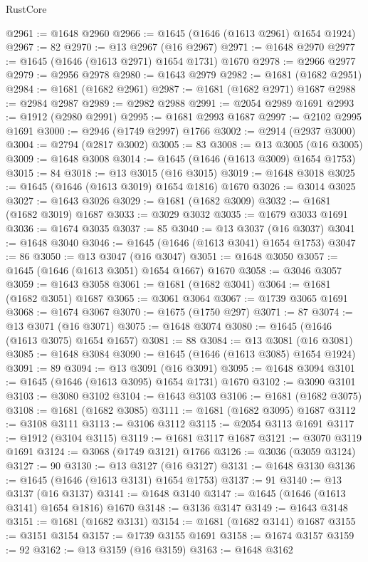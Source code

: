 \begin{lexlean}{RustCore}
\begin{coremodule}
@2961 := @1648 @2960
@2966 := @1645 (@1646 (@1613 @2961) @1654 @1924)
@2967 := 82
@2970 := @13 @2967 (@16 @2967)
@2971 := @1648 @2970
@2977 := @1645 (@1646 (@1613 @2971) @1654 @1731) @1670
@2978 := @2966 @2977
@2979 := @2956 @2978
@2980 := @1643 @2979
@2982 := @1681 (@1682 @2951)
@2984 := @1681 (@1682 @2961)
@2987 := @1681 (@1682 @2971) @1687
@2988 := @2984 @2987
@2989 := @2982 @2988
@2991 := @2054 @2989 @1691
@2993 := @1912 (@2980 @2991)
@2995 := @1681 @2993 @1687
@2997 := @2102 @2995 @1691
@3000 := @2946 (@1749 @2997) @1766
@3002 := @2914 (@2937 @3000)
@3004 := @2794 (@2817 @3002)
@3005 := 83
@3008 := @13 @3005 (@16 @3005)
@3009 := @1648 @3008
@3014 := @1645 (@1646 (@1613 @3009) @1654 @1753)
@3015 := 84
@3018 := @13 @3015 (@16 @3015)
@3019 := @1648 @3018
@3025 := @1645 (@1646 (@1613 @3019) @1654 @1816) @1670
@3026 := @3014 @3025
@3027 := @1643 @3026
@3029 := @1681 (@1682 @3009)
@3032 := @1681 (@1682 @3019) @1687
@3033 := @3029 @3032
@3035 := @1679 @3033 @1691
@3036 := @1674 @3035
@3037 := 85
@3040 := @13 @3037 (@16 @3037)
@3041 := @1648 @3040
@3046 := @1645 (@1646 (@1613 @3041) @1654 @1753)
@3047 := 86
@3050 := @13 @3047 (@16 @3047)
@3051 := @1648 @3050
@3057 := @1645 (@1646 (@1613 @3051) @1654 @1667) @1670
@3058 := @3046 @3057
@3059 := @1643 @3058
@3061 := @1681 (@1682 @3041)
@3064 := @1681 (@1682 @3051) @1687
@3065 := @3061 @3064
@3067 := @1739 @3065 @1691
@3068 := @1674 @3067
@3070 := @1675 (@1750 @297)
@3071 := 87
@3074 := @13 @3071 (@16 @3071)
@3075 := @1648 @3074
@3080 := @1645 (@1646 (@1613 @3075) @1654 @1657)
@3081 := 88
@3084 := @13 @3081 (@16 @3081)
@3085 := @1648 @3084
@3090 := @1645 (@1646 (@1613 @3085) @1654 @1924)
@3091 := 89
@3094 := @13 @3091 (@16 @3091)
@3095 := @1648 @3094
@3101 := @1645 (@1646 (@1613 @3095) @1654 @1731) @1670
@3102 := @3090 @3101
@3103 := @3080 @3102
@3104 := @1643 @3103
@3106 := @1681 (@1682 @3075)
@3108 := @1681 (@1682 @3085)
@3111 := @1681 (@1682 @3095) @1687
@3112 := @3108 @3111
@3113 := @3106 @3112
@3115 := @2054 @3113 @1691
@3117 := @1912 (@3104 @3115)
@3119 := @1681 @3117 @1687
@3121 := @3070 @3119 @1691
@3124 := @3068 (@1749 @3121) @1766
@3126 := @3036 (@3059 @3124)
@3127 := 90
@3130 := @13 @3127 (@16 @3127)
@3131 := @1648 @3130
@3136 := @1645 (@1646 (@1613 @3131) @1654 @1753)
@3137 := 91
@3140 := @13 @3137 (@16 @3137)
@3141 := @1648 @3140
@3147 := @1645 (@1646 (@1613 @3141) @1654 @1816) @1670
@3148 := @3136 @3147
@3149 := @1643 @3148
@3151 := @1681 (@1682 @3131)
@3154 := @1681 (@1682 @3141) @1687
@3155 := @3151 @3154
@3157 := @1739 @3155 @1691
@3158 := @1674 @3157
@3159 := 92
@3162 := @13 @3159 (@16 @3159)
@3163 := @1648 @3162

\end{coremodule}
\end{lexlean}
